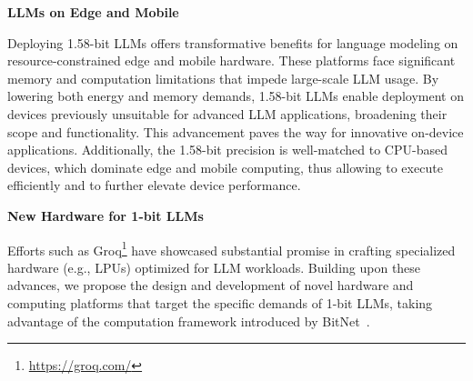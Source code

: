 \textbf{LLMs on Edge and Mobile}

Deploying 1.58-bit LLMs offers transformative benefits for language modeling on resource-constrained edge and mobile hardware. These platforms face significant memory and computation limitations that impede large-scale LLM usage. By lowering both energy and memory demands, 1.58-bit LLMs enable deployment on devices previously unsuitable for advanced LLM applications, broadening their scope and functionality. This advancement paves the way for innovative on-device applications. Additionally, the 1.58-bit precision is well-matched to CPU-based devices, which dominate edge and mobile computing, thus allowing  to execute efficiently and to further elevate device performance.

\textbf{New Hardware for 1-bit LLMs}

Efforts such as Groq\footnote{\url{https://groq.com/}} have showcased substantial promise in crafting specialized hardware (e.g., LPUs) optimized for LLM workloads. Building upon these advances, we propose the design and development of novel hardware and computing platforms that target the specific demands of 1-bit LLMs, taking advantage of the computation framework introduced by BitNet~\cite{bitnet}.